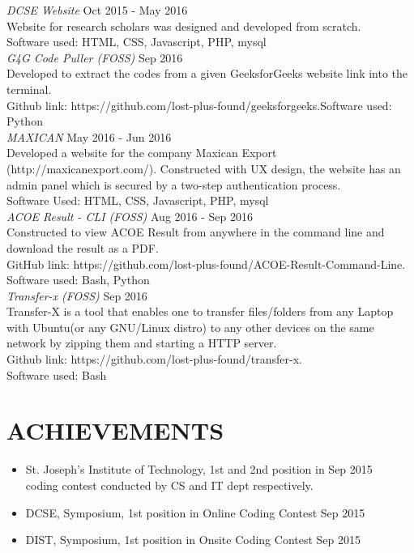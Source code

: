 \documentclass[margin, 10pt]{res} %
\begin{document}
\begin{resume}
{\sl DCSE Website} \hfill Oct 2015 - May 2016 \\
Website for research scholars was designed and developed from scratch. \\
Software used: HTML, CSS, Javascript, PHP, mysql  \\

{\sl G4G Code Puller (FOSS)} \hfill Sep 2016 \\
Developed to extract the codes from a given GeeksforGeeks website link into the terminal.\\
Github link: https://github.com/lost-plus-found/geeksforgeeks.Software used: Python \\

{\sl MAXICAN } \hfill May 2016 - Jun 2016 \\
Developed a website for the company Maxican Export (http://maxicanexport.com/). Constructed with UX design, the website has an admin panel which is secured by a two-step authentication process.  \\
Software Used: HTML, CSS, Javascript, PHP, mysql \\

{\sl ACOE Result - CLI (FOSS)} \hfill Aug 2016 - Sep 2016 \\
Constructed to view ACOE Result from anywhere in the command line and download the result as a PDF. \\
GitHub link: https://github.com/lost-plus-found/ACOE-Result-Command-Line.  
\\ Software used: Bash, Python \\

{\sl Transfer-x (FOSS)} \hfill Sep 2016 \\
Transfer-X is a tool that enables one to transfer files/folders from any Laptop with Ubuntu(or any GNU/Linux distro) to any other devices on the same network by zipping them and starting a HTTP server. \\ Github link: https://github.com/lost-plus-found/transfer-x. \\
Software used: Bash \\

\section{ACHIEVEMENTS}
\begin{itemize} 
\item St. Joseph's Institute of Technology, 1st and 2nd position in \hfill Sep 2015 \\ coding contest conducted by CS and IT dept respectively.
\item DCSE, Symposium, 1st position in Online Coding Contest \hfill Sep 2015
\item DIST, Symposium, 1st position in Onsite Coding Contest \hfill Sep 2015
\end{itemize}


\end{resume}
\end{document}
